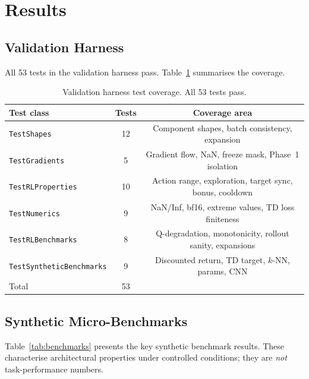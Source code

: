 \documentclass{article}
\begin{document}
\section{Results}
\label{sec:results}

\subsection{Validation Harness}

All 53 tests in the validation harness pass. Table~\ref{tab:tests} summarises the coverage.

\begin{table}[h]
  \centering
  \caption{Validation harness test coverage. All 53 tests pass.}
  \label{tab:tests}
  \begin{tabular}{lcc}
    \toprule
    \textbf{Test class} & \textbf{Tests} & \textbf{Coverage area} \\
    \midrule
    \texttt{TestShapes} & 12 & Component shapes, batch consistency, expansion \\
    \texttt{TestGradients} & 5 & Gradient flow, NaN, freeze mask, Phase~1 isolation \\
    \texttt{TestRLProperties} & 10 & Action range, exploration, target sync, bonus, cooldown \\
    \texttt{TestNumerics} & 9 & NaN/Inf, bf16, extreme values, TD loss finiteness \\
    \texttt{TestRLBenchmarks} & 8 & Q-degradation, monotonicity, rollout sanity, expansions \\
    \texttt{TestSyntheticBenchmarks} & 9 & Discounted return, TD target, $k$-NN, params, CNN \\
    \midrule
    Total & 53 & \\
    \bottomrule
  \end{tabular}
\end{table}

\subsection{Synthetic Micro-Benchmarks}

Table~\ref{tab:benchmarks} presents the key synthetic benchmark results. These characterise architectural properties under controlled conditions; they are \emph{not} task-performance numbers.
\end{document}
